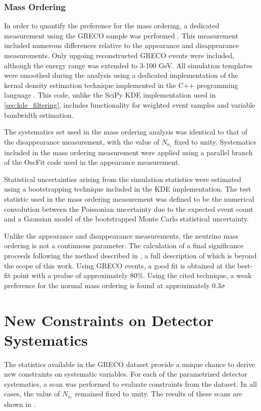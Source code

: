 \subsubsection{Mass Ordering}
In order to quantify the preference for the mass ordering, a dedicated measurement using the GRECO sample was performed .
This measurement included numerous differences relative to the appearance and disappearance measurements.
Only upgoing reconstructed GRECO events were included, although the energy range was extended to 3-100 GeV.
All simulation templates were smoothed during the analysis using a dedicated implementation of the kernal density estimation technique implemented in the C++ programming language .
This code, unlike the SciPy KDE implementation used in \ref{sec:kde_filtering}, includes functionality for weighted event samples and variable bandwidth estimation.

The systematics set used in the mass ordering analysis was identical to that of the disappearance measurement, with the value of ${N_{\nu_\tau}}$ fixed to unity.
Systematics included in the mass ordering measurement were applied using a parallel branch of the OscFit code used in the appearance measurement.

Statistical uncertainties arising from the simulation statistics were estimated using a bootstrapping technique included in the KDE implementation.
The test statistic used in the mass ordering measurement was defined to be the numerical convolution between the Poissonian uncertainty due to the expected event count and a Gaussian model of the bootstrapped Monte Carlo statistical uncertainty.

Unlike the appearance and disappearance measurements, the neutrino mass ordering is not a continuous parameter. 
The calculation of a final significance proceeds following the method described in , a full description of which is beyond the scope of this work.
Using GRECO events, a good fit is obtained at the best-fit point with a pvalue of approximately 80\%.
Using the cited technique, a weak preference for the normal mass ordering is found at approximately 0.3${\sigma}$ 

\label{subsec:syst_constraints}
\section{New Constraints on Detector Systematics}
The statistics available in the GRECO dataset provide a unique chance to derive new constraints on systematic variables.
For each of the parametrized detector systematics, a scan was performed to evaluate constraints from the dataset.
In all cases, the value of ${N_{\nu_\tau}}$ remained fixed to unity.
The results of these scans are shown in .

